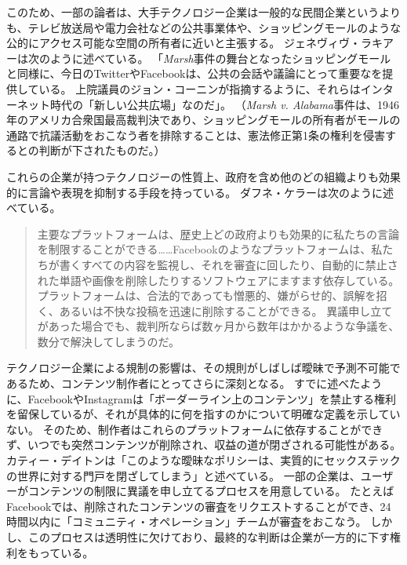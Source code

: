 \documentclass[paper=a4,book,openany]{jlreq} \usepackage{mystyle}
\begin{document}
このため、一部の論者は、大手テクノロジー企業は一般的な民間企業というよりも、テレビ放送局や電力会社などの公共事業体や、ショッピングモールのような公的にアクセス可能な空間の所有者に近いと主張する\citep{swire17:_shoul_leadin_onlin_tech_compan}。
ジェネヴィヴ・ラキアーは次のように述べている。
「\emph{Marsh}事件の舞台となったショッピングモールと同様に、今日のTwitterやFacebookは、公共の会話や議論にとって重要なを提供している。
上院議員のジョン・コーニンが指摘するように、それらはインターネット時代の「新しい公共広場」なのだ」\citep{lakier21:_great_free_speec_rever}。
（\emph{Marsh v. Alabama}事件は、1946年のアメリカ合衆国最高裁判決であり、ショッピングモールの所有者がモールの通路で抗議活動をおこなう者を排除することは、憲法修正第1条の権利を侵害するとの判断が下されたものだ。）

これらの企業が持つテクノロジーの性質上、政府を含め他のどの組織よりも効果的に言論や表現を抑制する手段を持っている。
ダフネ・ケラーは次のように述べている。

\begin{quote}
主要なプラットフォームは、歴史上どの政府よりも効果的に私たちの言論を制限することができる……Facebookのようなプラットフォームは、私たちが書くすべての内容を監視し、それを審査に回したり、自動的に禁止された単語や画像を削除したりするソフトウェアにますます依存している。
プラットフォームは、合法的であっても憎悪的、嫌がらせ的、誤解を招く、あるいは不快な投稿を迅速に削除することができる。
異議申し立てがあった場合でも、裁判所ならば数ヶ月から数年はかかるような争議を、数分で解決してしまうのだ。
\citep{keller19:_faceb_restr_speec_popul_deman}
\end{quote}

テクノロジー企業による規制の影響は、その規則がしばしば曖昧で予測不可能であるため、コンテンツ制作者にとってさらに深刻となる。
すでに述べたように、FacebookやInstagramは「ボーダーライン上のコンテンツ」を禁止する権利を留保しているが、それが具体的に何を指すのかについて明確な定義を示していない。
そのため、制作者はこれらのプラットフォームに依存することができず、いつでも突然コンテンツが削除され、収益の道が閉ざされる可能性がある。
カティー・デイトンは「このような曖昧なポリシーは、実質的にセックステックの世界に対する門戸を閉ざしてしまう」と述べている\citep{deighton20:_why_sex_start_face_uphil_paymen_battl}。
一部の企業は、ユーザーがコンテンツの制限に異議を申し立てるプロセスを用意している。
たとえばFacebookでは、削除されたコンテンツの審査をリクエストすることができ、24時間以内に「コミュニティ・オペレーション」チームが審査をおこなう。
しかし、このプロセスは透明性に欠けており、最終的な判断は企業が一方的に下す権利をもっている。
\end{document}
